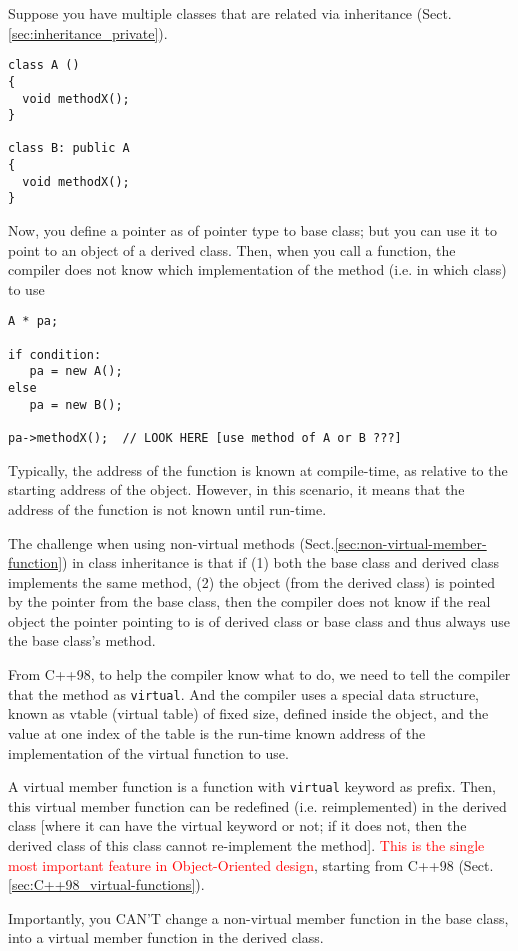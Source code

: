 Suppose you have multiple classes that are related via inheritance
(Sect.\ref{sec:inheritance_private}). 
\begin{verbatim}
class A ()
{
  void methodX();
}

class B: public A 
{
  void methodX();
}
\end{verbatim}

Now, you define a pointer as of pointer type to base class; but you can use it
to point to an object of a derived class. Then, when you call a function, the compiler does not know
which implementation of the method (i.e. in which class) to use
\begin{verbatim}
A * pa; 

if condition:
   pa = new A();
else
   pa = new B();

pa->methodX();  // LOOK HERE [use method of A or B ???]
\end{verbatim}

Typically, the address of the function is known at compile-time, as relative to
the starting address of the object.
However, in this scenario, it means that the address of the function is not
known until run-time.

The challenge when using non-virtual methods
(Sect.\ref{sec:non-virtual-member-function}) in class inheritance is that if (1)
both the base class and derived class implements the same method, (2) the object
(from the derived class) is pointed by the pointer from the base class, then the
compiler does not know if the real object the pointer pointing to is of derived
class or base class and thus always use the base class's method.

From C++98, to help the compiler know what to do, we need to tell the compiler
that the method as \verb!virtual!. And the compiler uses a special data
structure, known as vtable (virtual table) of fixed size, defined inside the
object, and the value at one index of the table is the run-time known address of
the implementation of the virtual function to use.


A virtual member function is a function with \verb!virtual! keyword as prefix.
Then, this virtual member function can be redefined (i.e. reimplemented) in the
derived class [where it can have the virtual keyword or not; if it does not,
then the derived class of this class cannot re-implement the method].
\textcolor{red}{This is the single most important feature in Object-Oriented
design}, starting from C++98 (Sect.\ref{sec:C++98_virtual-functions}).

Importantly, you CAN'T change a non-virtual member function in the base
class, into a virtual member function in the derived class.

